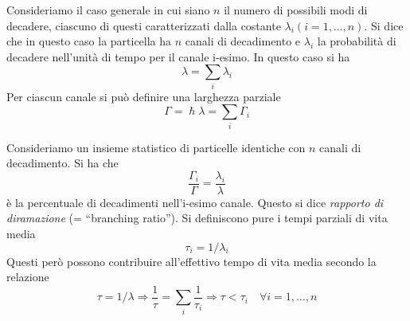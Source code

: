 Consideriamo il caso generale in cui siano $n$ il numero di possibili modi di decadere, ciascuno di questi caratterizzati dalla costante $\lambda_i(i=1,\dots,n)$. Si dice che in questo caso la particella ha $n$ canali di decadimento e $\lambda_i$ la probabilità di decadere nell'unità di tempo per il canale i-esimo. In questo caso si ha
\begin{equation}
 \lambda = \sum_i\lambda_i
\end{equation}
Per ciascun canale si può definire una larghezza parziale
\begin{equation}
 \Gamma = \hslash \lambda = \sum_i\Gamma_i
\end{equation}

Consideriamo un insieme statistico di particelle identiche con $n$ canali di decadimento. Si ha che
\begin{equation}
\frac{\Gamma_i}{\Gamma} = \frac{\lambda_i}{\lambda}
\end{equation}
è la percentuale di decadimenti nell'i-esimo canale. Questo si dice \textit{rapporto di diramazione} (= ``branching ratio''). Si definiscono pure i tempi parziali di vita media
\begin{equation}
 \tau_i = 1/\lambda_i
\end{equation}
Questi però possono contribuire all'effettivo tempo di vita media secondo la relazione
\begin{equation}
 \tau = 1/\lambda\Rightarrow \frac{1}{\tau} = \sum_i\frac{1}{\tau_i}\Rightarrow\tau<\tau_i\quad\forall i = 1,\dots,n
\end{equation}
